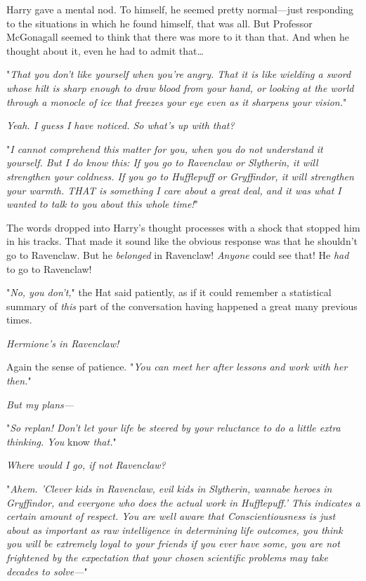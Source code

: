 Harry gave a mental nod. To himself, he seemed pretty normal---just responding 
to the situations in which he found himself, that was all. But Professor 
McGonagall seemed to think that there was more to it than that. And when he 
thought about it, even he had to admit that{\ldots}

"\emph{That you don't like yourself when you're angry. That it is like wielding 
a sword whose hilt is sharp enough to draw blood from your hand, or looking at 
the world through a monocle of ice that freezes your eye even as it sharpens 
your vision.}"

\emph{Yeah. I guess I have noticed. So what's up with that?}

"\emph{I cannot comprehend this matter for you, when you do not understand it 
yourself. But I do know this: If you go to Ravenclaw or Slytherin, it will 
strengthen your coldness. If you go to Hufflepuff or Gryffindor, it will 
strengthen your warmth. THAT is something I care about a great deal, and it was 
what I wanted to talk to you about this whole time!}"

The words dropped into Harry's thought processes with a shock that stopped him 
in his tracks. That made it sound like the obvious response was that he 
shouldn't go to Ravenclaw. But he \emph{belonged} in Ravenclaw! \emph{Anyone} 
could see that! He \emph{had} to go to Ravenclaw!

"\emph{No, you don't,}" the Hat said patiently, as if it could remember a 
statistical summary of \emph{this} part of the conversation having happened a 
great many previous times.

\emph{Hermione's in Ravenclaw!}

Again the sense of patience. "\emph{You can meet her after lessons and work 
with her then.}"

\emph{But my plans---}

"\emph{So replan! Don't let your life be steered by your reluctance to do a 
little extra thinking. You} know\emph{ that.}"

\emph{Where would I go, if not Ravenclaw?}

"\emph{Ahem. 'Clever kids in Ravenclaw, evil kids in Slytherin, wannabe heroes 
in Gryffindor, and everyone who does the actual work in Hufflepuff.' This 
indicates a certain amount of respect. You are well aware that 
Conscientiousness is just about as important as raw intelligence in determining 
life outcomes, you think you will be extremely loyal to your friends if you 
ever have some, you are not frightened by the expectation that your chosen 
scientific problems may take decades to solve---}"

